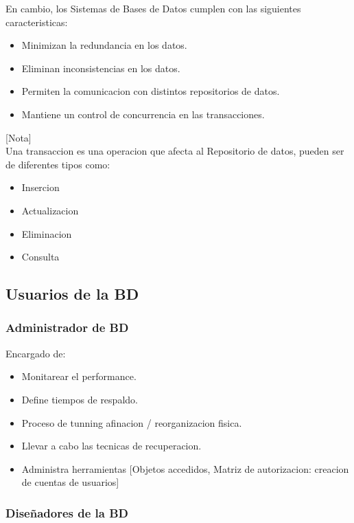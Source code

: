 \documentclass[twoside]{article}
\begin{document}
En cambio, los Sistemas de Bases de Datos cumplen con las siguientes caracteristicas:

\begin{itemize}
  \item Minimizan la redundancia en los datos.
  \item Eliminan inconsistencias en los datos.
  \item Permiten la comunicacion con distintos repositorios de datos.
  \item Mantiene un control de concurrencia en las transacciones.
\end{itemize}

[Nota]\\
Una transaccion es una operacion que afecta al Repositorio de datos, pueden ser de diferentes tipos como:\\
\begin{itemize}
  \item Insercion
  \item Actualizacion
  \item Eliminacion
  \item Consulta
\end{itemize}


\subsection{Usuarios de la BD}

\subsubsection{Administrador de BD}

Encargado de:

\begin{itemize}
  \item Monitarear el performance.
  \item Define tiempos de respaldo.
  \item Proceso de tunning \rightarrow afinacion / reorganizacion fisica.
  \item Llevar a cabo las tecnicas de recuperacion.
  \item Administra herramientas [Objetos accedidos, Matriz de autorizacion: creacion de cuentas de usuarios]
\end{itemize}

\subsubsection{Diseñadores de la BD}
\end{document}
